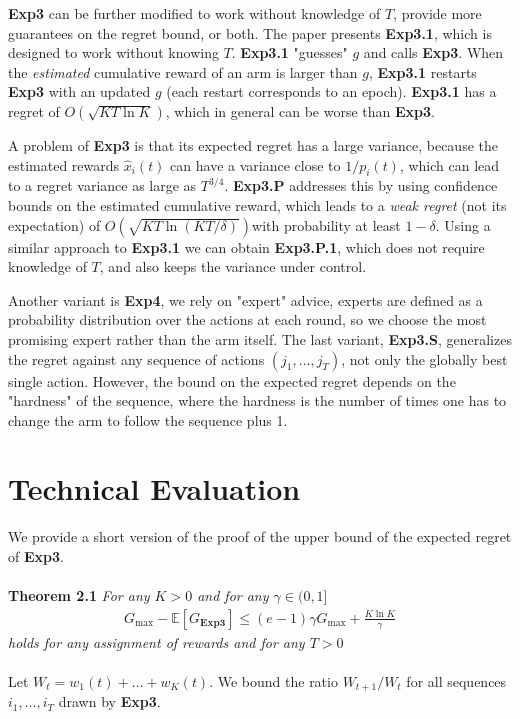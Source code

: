 \documentclass[12pt,a4paper]{article}
\begin{document}
\textbf{Exp3} can be further modified to  work without knowledge of $T$, provide more guarantees on the regret bound, or both.  The paper presents \textbf{Exp3.1}, which is designed to work without knowing $T$. \textbf{Exp3.1} "guesses" $g$ and calls \textbf{Exp3}.  When the \textit{estimated} cumulative reward of an arm is larger than $g$, \textbf{Exp3.1} restarts \textbf{Exp3} with an updated $g$ (each restart corresponds to an epoch). \textbf{Exp3.1} has a regret of ${O}(\sqrt{KT\ln K})$, which in general can be worse than \textbf{Exp3}.

A problem of \textbf{Exp3} is that its expected regret has a large variance, because the estimated rewards $\hat{x}_i(t)$  can have a variance close to ${1}/{p_i(t)}$, which can lead to a regret variance as large as $T^{3/4}$. 
\textbf{Exp3.P} addresses this by using confidence bounds on the estimated cumulative reward, which leads  to a  \textit{weak regret} (not its expectation)  of ${O}(\sqrt{KT\ln(KT/\delta)})$with probability at least $1-\delta$. Using a similar approach to \textbf{Exp3.1} we can obtain \textbf{Exp3.P.1}, which does not require knowledge of $T$, and also keeps the variance under control. 

Another variant is \textbf{Exp4}, we rely on "expert" advice, experts are defined as a probability distribution over the actions at each round, so we choose the most promising expert rather than the arm itself.  The last variant, \textbf{Exp3.S}, generalizes the regret against any sequence of actions $(j_1,\dots,j_T)$, not only the globally best single action.  However, the bound on the expected regret depends on the "hardness" of the sequence, where the hardness is the number of times one has to change the arm to follow the sequence plus 1.

\section{Technical Evaluation}

We provide a short version of the proof of the upper bound of the expected regret of \textbf{Exp3}. 
\\\\
\textbf{Theorem 2.1}	\textit{For any $K > 0$ and for any $\gamma \in (0,1]$} 
	\begin{align*}
		G_{\max}-\mathbb{E}[G_{\textbf{Exp3}}] \leq (e-1)\gamma G_{\max}+\frac{K\ln K}{\gamma}
	\end{align*}
	\textit{holds for any assignment of rewards and for any $T > 0$}
\\\\
Let $W_t = w_1(t)+ \dots +  w_K(t)$. We bound the ratio $W_{t+1}/W_t$ for all sequences $i_1,\dots,i_T$ drawn by \textbf{Exp3}.
\end{document}

